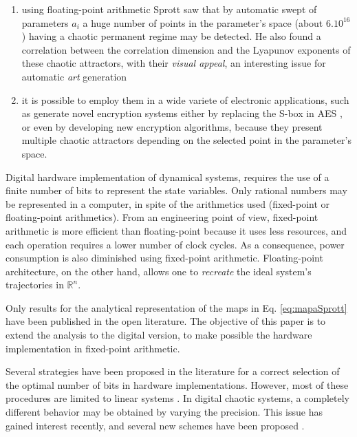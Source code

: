 \begin{enumerate}
\item using floating-point arithmetic Sprott saw
that by automatic swept of parameters $a_i$ a huge number of
points in the parameter's space (about $6  .  10^{16}$) having
a chaotic permanent regime may be detected. He also
found a correlation between the correlation dimension and the
Lyapunov exponents of these chaotic attractors, with their
\textsl{visual appeal}, an interesting issue for automatic
\textsl{art} generation
\item it is possible to employ them in a wide variete of electronic applications, such as generate novel encryption systems either by replacing the S-box in AES \cite{Ahmad2013,Hussain2013}, or even by developing new encryption algorithms, because they present multiple chaotic attractors depending on the selected
point in the parameter's space.
\end{enumerate}

Digital hardware implementation of dynamical systems, requires the use of
a finite number of bits to represent the state variables. Only rational numbers may be represented in a computer, in spite of the arithmetics used (fixed-point or floating-point arithmetics). From an engineering point of view, fixed-point arithmetic is more efficient than floating-point because it uses less resources, and each operation requires a lower number of clock cycles. As a consequence, power consumption is also diminished using fixed-point arithmetic. Floating-point architecture, on the other hand,  allows one to \textsl{recreate} the ideal system's trajectories in $\mathbb{R}^n$.

Only results for the analytical representation of the
maps in Eq. \ref{eq:mapaSprott} have been published in the open literature. The objective of
this paper is to extend the analysis to the digital version, to make
possible  the hardware implementation in fixed-point arithmetic.

Several strategies have been proposed in the literature for a correct
selection of the optimal number of bits in hardware
implementations. However, most of these procedures are limited to linear systems
\cite{Constantinides2002,Constantinides2003}. In digital
chaotic systems, a completely different behavior may be obtained by
varying the precision.  This issue  has gained interest recently,
and several new schemes have been proposed
\cite{Ding2007,Asseri2002,Azzaz2009}.

